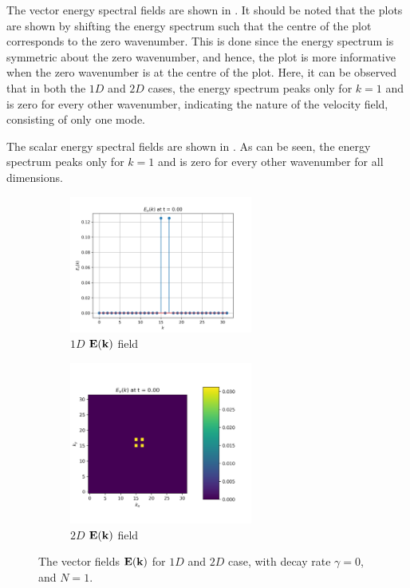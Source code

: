 The vector energy spectral fields are shown in . It should be noted that the plots are shown by shifting the energy spectrum such that the centre of the plot corresponds to the zero wavenumber. This is done since the energy spectrum is symmetric about the zero wavenumber, and hence, the plot is more informative when the zero wavenumber is at the centre of the plot. Here, it can be observed that in both the $1D$ and $2D$ cases, the energy spectrum peaks only for $k=1$ and is zero for every other wavenumber, indicating the nature of the velocity field, consisting of only one mode. 

The scalar energy spectral fields are shown in . As can be seen, the energy spectrum peaks only for $k=1$ and is zero for every other wavenumber for all dimensions.

\begin{figure}[H]
    \begin{subfigure}{7cm}
      \centering\includegraphics[width=6cm]{Code-Figures/espec-simple-1d/EK_spectrum.png}
      \caption{$1D$ $\mathbf{E}(\mathbf{k})$ field}
    \end{subfigure}
    \begin{subfigure}{7cm}
      \centering\includegraphics[width=6cm]{Code-Figures/espec-simple-2d/EK_spectrum.png}
      \caption{$2D$ $\mathbf{E}(\mathbf{k})$ field}
    \end{subfigure}
    \caption{The vector fields $\mathbf{E}(\mathbf{k})$ for $1D$ and $2D$ case, with decay rate $\gamma=0$, and $N=1$.}
    \label{fig:espec-vector-fields-N1}
\end{figure}

